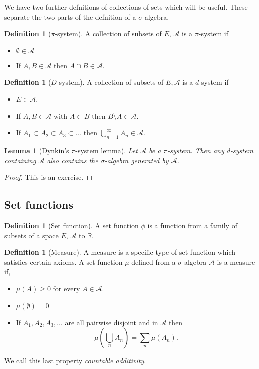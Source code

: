 \documentclass[11pt]{article}
\newtheorem{lem}[thm]{Lemma}
\theoremstyle{definition}
\newtheorem{dfn}[thm]{Definition}
\theoremstyle{remark}
\begin{document}
We have two further defnitions of collections of sets which will be useful. These separate the two parts of the defnition of a $\sigma$-algebra.
\begin{dfn}[$\pi$-system]
A collection of subsets of $E$, $\mathcal{A}$ is a $\pi$-system if
\begin{itemize}
\item $\emptyset \in \mathcal{A}$
\item If $A, B \in \mathcal{A}$ then $A \cap B \in \mathcal{A}$.
\end{itemize}
\end{dfn}

\begin{dfn}[$D$-system]
A collection of subsets of $E, \mathcal{A}$ is a $d$-system if
\begin{itemize}
\item $E \in \mathcal{A}$.
\item If $A, B \in \mathcal{A}$ with $A \subset B$ then $B \setminus A \in \mathcal{A}$.
\item If $A_1 \subset A_2 \subset A_3 \subset \dots$ then $ \bigcup_{n=1}^\infty A_n \in \mathcal{A}$.
\end{itemize}
\end{dfn}
\begin{lem}[Dynkin's $\pi$-system lemma]
Let $\mathcal{A}$ be a $\pi$-system. Then any $d$-system containing $\mathcal{A}$ also contains the $\sigma$-algebra generated by $\mathcal{A}$.
\end{lem}
\begin{proof} This is an exercise.
\end{proof}

\subsection{Set functions}

\begin{dfn}[Set function] A set function $\phi$ is a function from a family of subsets of a space $E$, $\mathcal{A}$ to $\mathbb{R}$.
\end{dfn}

\begin{dfn}[Measure] A measure is a specific type of set function which satisfies certain axioms. A set function $\mu$ defined from a $\sigma$-algebra $\mathcal{A}$ is a measure if,
\begin{itemize}
\item $\mu(A) \geq 0$ for every $A \in \mathcal{A}$.
\item $\mu(\emptyset) = 0$
\item If $A_1, A_2, A_3, \dots$ are all pairwise disjoint and in $\mathcal{A}$ then 
\[ \mu \left( \bigcup_n A_n \right) = \sum_n \mu(A_n). \]
\end{itemize}
We call this last property \emph{countable additivity}.
\end{dfn}
\end{document}
